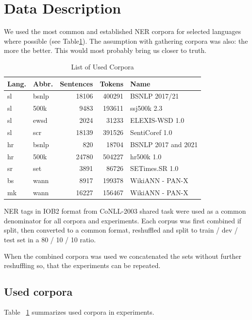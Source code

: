 \documentclass[sigconf]{acmart}
\begin{document}
\section{Data Description}
We used the most common and established NER corpora for selected languages where possible (see Table\ref{tab:corpora}).
The assumption with gathering corpora was also: the more the better.
This would most probably bring us closer to truth.
\begin{table}[H]
  \caption{List of Used Corpora}
  \label{tab:corpora}
  \begin{tabular}{llrrl}
    \toprule
    Lang.&Abbr.&Sentences&Tokens&Name\\
    \midrule
    sl&bsnlp&18106&400291&BSNLP 2017/21\cite{piskorski-etal-2021-slav}\\
    sl&500k&9483&193611&ssj500k 2.3\cite{ssj500k-23}\\
    sl&ewsd&2024&31233&{ELEXIS}-{WSD} 1.0\cite{ELEXIS-WSD-10}\\
    sl&scr&18139&391526&{SentiCoref} 1.0\cite{SentiCoref-10}\\
    \midrule
    hr&bsnlp&820&18704&BSNLP 2017 and 2021\cite{piskorski-etal-2021-slav}\\
    hr&500k&24780&504227&hr500k 1.0\cite{hr500k-10}\\
    \midrule
    sr&set&3891&86726&{SETimes}.{SR} 1.0\cite{SETimes-SR-1.0}\\
    \midrule
    bs&wann&8917&199378&WikiANN - PAN-X\cite{rahimi-etal-2019-massively}\\
    \midrule
    mk&wann&16227&156467&WikiANN - PAN-X\cite{rahimi-etal-2019-massively}\\
  \bottomrule
  \end{tabular}
\end{table}
NER tags in IOB2\cite{IOB2} format from CoNLL-2003 shared task\cite{CoNLL2003} were used as a common denominator for all corpora and experiments.
Each corpus was first combined if split, then converted to a common format, reshuffled and split to train / dev / test set in a 80 / 10 / 10 ratio.

When the combined corpora was used we concatenated the sets without further reshuffling so, that the experiments can be repeated.
\subsection{Used corpora}
Table ~\ref{tab:corpora} summarizes used corpora in experiments.
\end{document}
